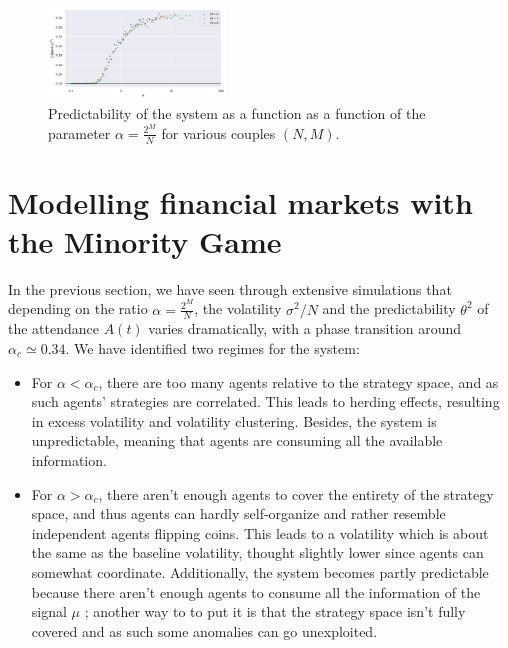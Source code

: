 \documentclass[a4paper, amsfonts, amssymb, amsmath, reprint, showkeys, nofootinbib, twoside]{revtex4-1}
\begin{document}
\begin{figure}[H]
    \centering
    \includegraphics[width=0.42\textwidth]{figures/predictability.png}
    \caption{Predictability of the system as a function as a function of the parameter $\alpha = \frac{2^M}{N}$ for various couples $(N, M)$.}
    \label{fig:predictability}
\end{figure}


\section{Modelling financial markets with the Minority Game}
\label{sec:financial-markets}

In the previous section, we have seen through extensive simulations that depending on the ratio $\alpha = \frac{2^M}{N}$, the volatility $\sigma^2 / N$ and the predictability $\theta^2$ of the attendance $A(t)$ varies dramatically, with a phase transition around $\alpha_c \simeq 0.34$. We have identified two regimes for the system:
\begin{itemize}
    \item For $\alpha < \alpha_c$, there are too many agents relative to the strategy space, and as such agents' strategies are correlated. This leads to herding effects, resulting in excess volatility and volatility clustering. Besides, the system is unpredictable, meaning that agents are consuming all the available information.
    \item For $\alpha > \alpha_c$, there aren't enough agents to cover the entirety of the strategy space, and thus agents can hardly self-organize and rather resemble independent agents flipping coins. This leads to a volatility which is about the same as the baseline volatility, thought slightly lower since agents can somewhat coordinate. Additionally, the system becomes partly predictable because there aren't enough agents to consume all the information of the signal $\mu$ ; another way to to put it is that the strategy space isn't fully covered and as such some anomalies can go unexploited.
\end{itemize}
\end{document}
